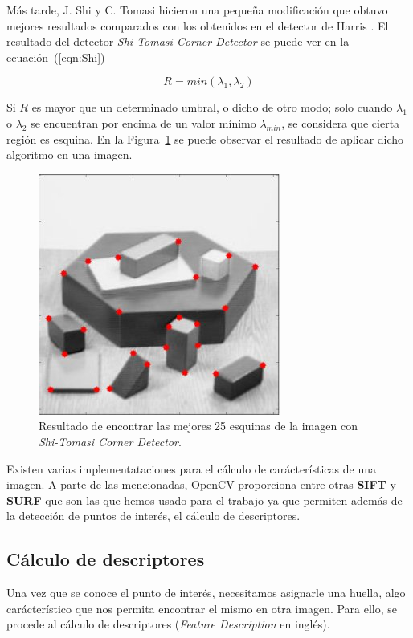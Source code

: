 Más tarde, J. Shi y C. Tomasi hicieron una pequeña modificación que obtuvo mejores resultados comparados con los obtenidos en el detector de Harris \parencite{Reference9}. El resultado del detector \textit{Shi-Tomasi Corner Detector} se puede ver en la ecuación~(\ref{eqn:Shi})

\begin{equation}
R=min(\lambda_{1},\lambda_{2})
\label{eqn:Shi}
\end{equation}

Si $R$ es mayor que un determinado umbral, o dicho de otro modo; solo cuando $\lambda_{1}$ o $\lambda_{2}$ se encuentran por encima de un valor mínimo $\lambda_{min}$, se considera que cierta región es esquina. En la Figura~\ref{fig:shi_detector} se puede observar el resultado de aplicar dicho algoritmo en una imagen.

\begin{figure}[ht]
\centering
\includegraphics[scale=0.5]{Figures/shi-detector.jpg}
\decoRule
\caption[ShiDetector]{Resultado de encontrar las mejores 25 esquinas de la imagen con \textit{Shi-Tomasi Corner Detector}.}
\label{fig:shi_detector}
\end{figure}

Existen varias implementataciones para el cálculo de carácterísticas de una imagen. A parte de las mencionadas, OpenCV proporciona entre otras \textbf{SIFT} y \textbf{SURF} que son las que hemos usado para el trabajo ya que permiten además de la detección de puntos de interés, el cálculo de descriptores.

\subsection{Cálculo de descriptores}

Una vez que se conoce el punto de interés, necesitamos asignarle una huella, algo carácterístico que nos permita encontrar el mismo en otra imagen. Para ello, se procede al cálculo de descriptores (\textit{Feature Description} en inglés).

